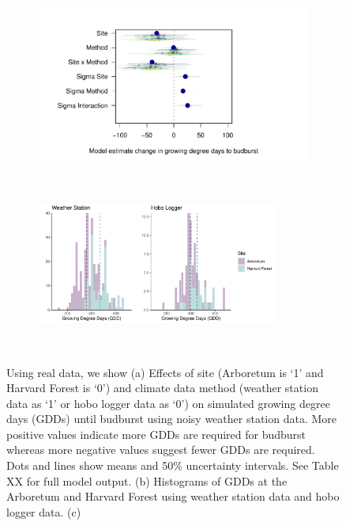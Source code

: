 \documentclass{article}\usepackage[]{graphicx}\usepackage[]{color}
\begin{document}
\begin{figure}
  \begin{subfigure}{.5\linewidth}
    \caption{}
    \centering
    \includegraphics[height=7cm, width=11cm]{..//analyses/figures/muplot_urban_real.pdf}
    \label{fig:muplotreal}
  \end{subfigure}%
    \begin{subfigure}{.5\linewidth}
      \caption{}
      \centering
      \includegraphics[height=4cm, width=8cm]{..//analyses/figures/gdd_methods_real.pdf}
    \label{fig:gddreal}
  \end{subfigure}\\[1ex]
\caption{ Using real data, we show (a) Effects of site (Arboretum is `1' and Harvard Forest is `0') and climate data method (weather station data as `1' or hobo logger data as `0') on simulated growing degree days (GDDs) until budburst using noisy weather station data. More positive values indicate more GDDs are required for budburst whereas more negative values suggest fewer GDDs are required. Dots and lines show means and 50\% uncertainty intervals. See Table XX for full model output. (b) Histograms of GDDs at the Arboretum and Harvard Forest using weather station data and hobo logger data. (c) }
\label{fig:real}
\end{figure}
\end{document}
